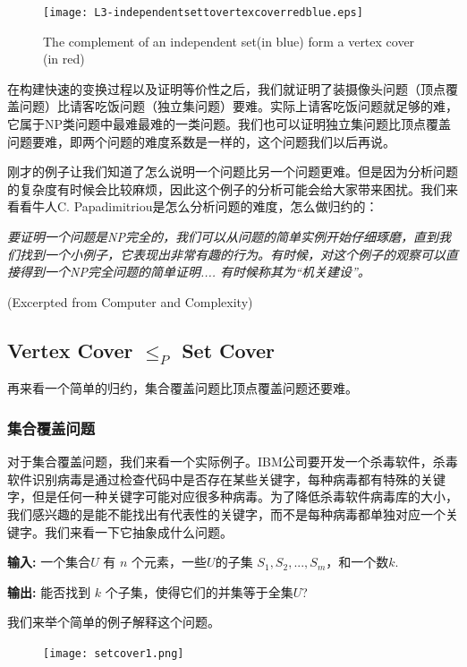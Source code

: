 \begin{figure}[H]
 	\centering
 	\texttt{[image: L3-independentsettovertexcoverredblue.eps]}
 	\caption{ {\small The complement of an  independent set(in blue) form a vertex cover (in red)} } 
\end{figure}

在构建快速的变换过程以及证明等价性之后，我们就证明了装摄像头问题（顶点覆盖问题）比请客吃饭问题（独立集问题）要难。实际上请客吃饭问题就足够的难，它属于NP类问题中最难最难的一类问题。我们也可以证明独立集问题比顶点覆盖问题要难，即两个问题的难度系数是一样的，这个问题我们以后再说。

刚才的例子让我们知道了怎么说明一个问题比另一个问题更难。但是因为分析问题的复杂度有时候会比较麻烦，因此这个例子的分析可能会给大家带来困扰。我们来看看牛人C. Papadimitriou是怎么分析问题的难度，怎么做归约的：

{\it 
要证明一个问题是NP完全的，我们可以从问题的简单实例开始仔细琢磨，直到我们找到一个小例子，它表现出非常有趣的行为。有时候，对这个例子的观察可以直接得到一个NP完全问题的简单证明.... 有时候称其为``机关建设''。
}

(Excerpted from Computer and Complexity)

\subsection{{\sc Vertex Cover} $\le_P$ {\sc Set Cover}}
再来看一个简单的归约，集合覆盖问题比顶点覆盖问题还要难。

\subsubsection{集合覆盖问题}

对于集合覆盖问题，我们来看一个实际例子。IBM公司要开发一个杀毒软件，杀毒软件识别病毒是通过检查代码中是否存在某些关键字，每种病毒都有特殊的关键字，但是任何一种关键字可能对应很多种病毒。为了降低杀毒软件病毒库的大小，我们感兴趣的是能不能找出有代表性的关键字，而不是每种病毒都单独对应一个关键字。我们来看一下它抽象成什么问题。

{\bf 输入:} 一个集合$U$ 有 $n$ 个元素，一些$U$的子集 $S_1, S_2,...,S_m$，和一个数$k$. 

{\bf 输出:} 能否找到 $k$ 个子集，使得它们的并集等于全集$U$?

我们来举个简单的例子解释这个问题。

\begin{figure}[H]
	\centering
	\texttt{[image: setcover1.png]}
\end{figure}

